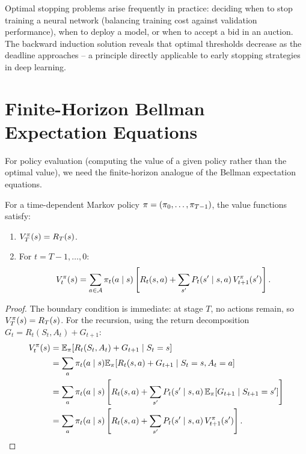 \documentclass[11pt,a4paper]{article}
\begin{document}
\begin{rlconnection}[title={Optimal Stopping and Real Applications}]
Optimal stopping problems arise frequently in practice: deciding
when to stop training a neural network (balancing training cost
against validation performance), when to deploy a model, or when
to accept a bid in an auction. The backward induction solution
reveals that optimal thresholds decrease as the deadline approaches
-- a principle directly applicable to early stopping strategies
in deep learning.
\end{rlconnection}


\section{Finite-Horizon Bellman Expectation Equations}
\label{sec:fh-bellman-expectation}

For policy evaluation (computing the value of a given policy rather
than the optimal value), we need the finite-horizon analogue of the
Bellman expectation equations.

\begin{theorem}
\label{thm:fh-bellman-expect}
For a time-dependent Markov policy
$\pi = (\pi_0, \ldots, \pi_{T-1})$, the value functions
satisfy:
\begin{enumerate}[nosep]
    \item $V_T^\pi(s) = R_T(s)$.
    \item For $t = T-1, \ldots, 0$:
    \begin{equation}
    \label{eq:fh-bellman-expect}
        V_t^\pi(s) = \sum_{a \in \mathcal{A}} \pi_t(a \mid s)
        \left[ R_t(s,a) + \sum_{s'} P_t(s' \mid s,a)\,
        V_{t+1}^\pi(s') \right].
    \end{equation}
\end{enumerate}
\end{theorem}

\begin{proof}
The boundary condition is immediate: at stage $T$, no actions remain,
so $V_T^\pi(s) = R_T(s)$. For the recursion, using the return
decomposition $G_t = R_t(S_t, A_t) + G_{t+1}$:
\begin{align*}
    V_t^\pi(s)
    &= \mathbb{E}_\pi[R_t(S_t, A_t) + G_{t+1} \mid S_t = s] \\
    &= \sum_a \pi_t(a \mid s)
       \mathbb{E}_\pi[R_t(s,a) + G_{t+1} \mid S_t = s, A_t = a] \\
    &= \sum_a \pi_t(a \mid s) \left[ R_t(s,a)
       + \sum_{s'} P_t(s' \mid s,a)\,
       \mathbb{E}_\pi[G_{t+1} \mid S_{t+1} = s'] \right] \\
    &= \sum_a \pi_t(a \mid s) \left[ R_t(s,a)
       + \sum_{s'} P_t(s' \mid s,a)\, V_{t+1}^\pi(s') \right].
       \qedhere
\end{align*}
\end{proof}
\end{document}
